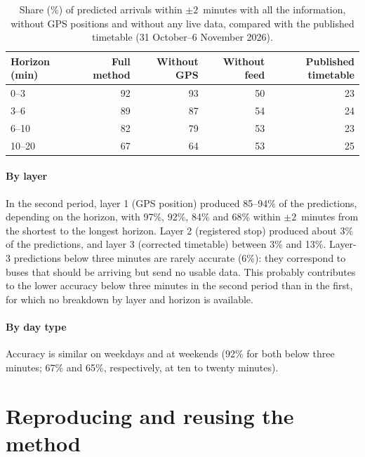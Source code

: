 \documentclass[preprint,11pt,nonatbib]{elsarticle}
\begin{document}
\begin{table}[t]
\centering
\caption{Share (\%) of predicted arrivals within $\pm2$~minutes with all the information, without GPS positions and
without any live data, compared with the published timetable (31 October--6 November 2026).}
\label{tab:ablation}
\small
\setlength{\tabcolsep}{4pt}
\begin{tabular}{@{}lrrrr@{}}
\toprule
Horizon (min) & Full method & Without GPS & Without feed & Published timetable \\
\midrule
0--3   & 92 & 93 & 50 & 23 \\
3--6   & 89 & 87 & 54 & 24 \\
6--10  & 82 & 79 & 53 & 23 \\
10--20 & 67 & 64 & 53 & 25 \\
\bottomrule
\end{tabular}
\end{table}

\paragraph{By layer} In the second period, layer 1 (GPS position) produced 85--94\% of the predictions, depending on
the horizon, with 97\%, 92\%, 84\% and 68\% within $\pm2$~minutes from the shortest to the longest horizon. Layer 2
(registered stop) produced about 3\% of the predictions, and layer 3 (corrected timetable) between 3\% and 13\%.
Layer-3 predictions below three minutes are rarely accurate (6\%): they correspond to buses that should be arriving
but send no usable data. This probably contributes to the lower accuracy below three minutes in the second period
than in the first, for which no breakdown by layer and horizon is available.

\paragraph{By day type} Accuracy is similar on weekdays and at weekends (92\% for both below three minutes; 67\% and
65\%, respectively, at ten to twenty minutes).



\section{Reproducing and reusing the method}
\label{sec:reuse}
\end{document}
